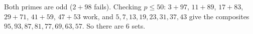 Both primes are odd ($2+98$ fails). Checking $p\le50$: $3+97$, $11+89$, $17+83$, $29+71$, $41+59$, $47+53$ work, and $5,7,13,19,23,31,37,43$ give the composites $95,93,87,81,77,69,63,57$. So there are $\boxed{6}$ sets.
